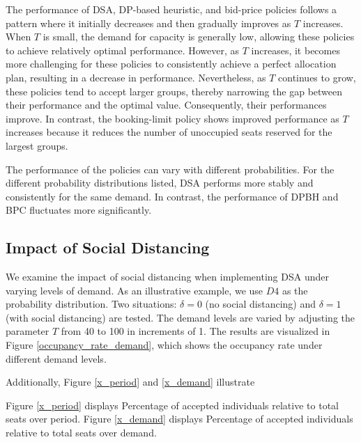 The performance of DSA, DP-based heuristic, and bid-price policies follows a pattern where it initially decreases and then gradually improves as $T$ increases. When $T$ is small, the demand for capacity is generally low, allowing these policies to achieve relatively optimal performance. However, as $T$ increases, it becomes more challenging for these policies to consistently achieve a perfect allocation plan, resulting in a decrease in performance. Nevertheless, as $T$ continues to grow, these policies tend to accept larger groups, thereby narrowing the gap between their performance and the optimal value. Consequently, their performances improve. In contrast, the booking-limit policy shows improved performance as $T$ increases because it reduces the number of unoccupied seats reserved for the largest groups. 

The performance of the policies can vary with different probabilities. For the different probability distributions listed, DSA performs more stably and consistently for the same demand. In contrast, the performance of DPBH and BPC fluctuates more significantly.


\subsection{Impact of Social Distancing}\label{impact_sd}
We examine the impact of social distancing when implementing DSA under varying levels of demand. As an illustrative example, we use $D4$ as the probability distribution. Two situations: $\delta =0$ (no social distancing) and $\delta = 1$ (with social distancing) are tested. The demand levels are varied by adjusting the parameter $T$ from 40 to 100 in increments of 1. 
The results are visualized in Figure \ref{occupancy_rate_demand}, which shows the occupancy rate under different demand levels. 

Additionally, Figure \ref{x_period} and \ref{x_demand} illustrate 

Figure \ref{x_period} displays Percentage of accepted individuals relative to total seats over period. Figure \ref{x_demand} displays Percentage of accepted individuals relative to total seats over demand. 




